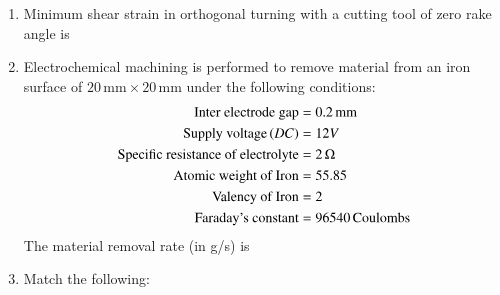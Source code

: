 \documentclass[journal]{IEEEtran}
\begin{document}
\begin{enumerate}
\begin{enumerate}
\end{enumerate}
\item Minimum shear strain in orthogonal turning with a cutting tool of zero rake angle is  
\begin{enumerate}
\end{enumerate}
\item Electrochemical machining is performed to remove material from an iron surface of $20 \, \text{mm} \times 20 \, \text{mm}$ under the following conditions:
	\begin{align*}
		\text{Inter electrode gap} &= 0.2 \, \text{mm} \\
		\text{Supply voltage} \left(DC\right) & =12V \\
		\text{Specific resistance of electrolyte} &= 2 \, \Omega \\
		\text{Atomic weight of Iron} &= 55.85 \\
		\text{Valency of Iron} &=2 \\
		\text{Faraday's constant} &= 96540 \,\text{Coulombs}
	\end{align*}
		The material removal rate (in g/s) is
\begin{enumerate}
\end{enumerate}
\item Match the following:
\begin{table}[h!]
        \centering
  
\end{table}	
	
\begin{enumerate}
\end{enumerate}
\end{enumerate}
\end{document}
